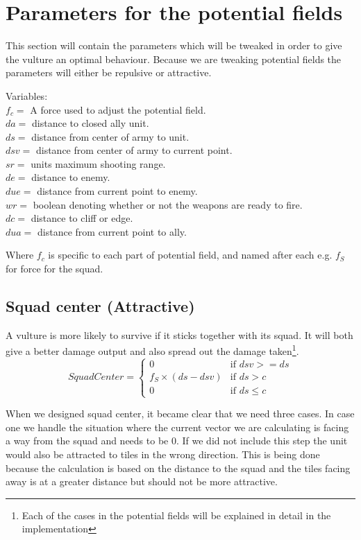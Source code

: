 \section{Parameters for the potential fields}
	This section will contain the parameters which will be tweaked in order to give the vulture an optimal behaviour. Because we are tweaking 
	potential fields the parameters will either be repulsive or attractive.
	
	Variables:\\
	$f_c =$ A force used to adjust the potential field.\\
	$da =$ distance to closed ally unit.\\
	$ds =$ distance from center of army to unit.\\
	$dsv =$ distance from center of army to current point.\\
	$sr =$ units maximum shooting range.\\
	$de =$ distance to enemy.\\
	$due =$ distance from current point to enemy.\\
	$wr =$ boolean denoting whether or not the weapons are ready to fire.\\
	$dc =$ distance to cliff or edge. \\
	$dua =$ distance from current point to ally.
	
	Where $f_c$ is specific to each part of potential field, and named after each e.g. $f_{S}$ for force for the squad.
	
	\subsection*{Squad center (Attractive)}
		\label{SCA_label}A vulture is more likely to survive if it sticks together with its squad. It will both give a better damage output and also spread out the 
		damage taken\footnote{Each of the cases in the potential fields will be explained in detail in the implementation}.
		\begin{displaymath}
			SquadCenter  = \begin{cases}
					0 & \text{if } dsv >= ds\\
					f_{S} \times (ds - dsv) & \text{if } ds > c\\
					0 & \text{if } ds \leq c
				\end{cases}		
		\end{displaymath}
		
		When we designed squad center, it became clear that we need three cases. 
		In case one we handle the situation where the current vector we are calculating is facing a way from the squad and needs to be 0. If we did not include this step the unit would also be attracted to tiles in the wrong direction. This is being done because the calculation is based on the distance to the squad and the tiles facing away is at a greater distance but should not be more attractive.
		
